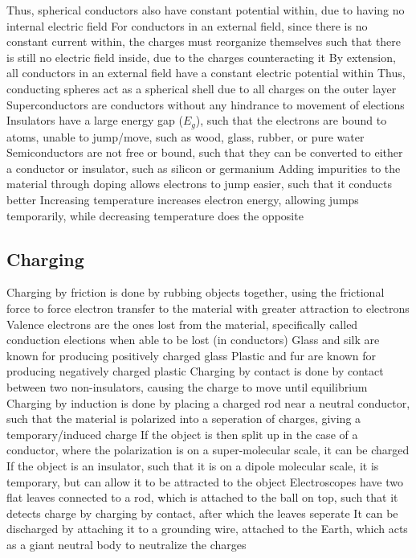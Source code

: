 \documentclass[11 pt, twoside]{article}
\newenvironment{outline*}
{
	\begin{outline}[enumerate]
	}
	{\end{outline}
}
\begin{document}
\begin{outline*}
\4 Thus, spherical conductors also have constant potential within, due to having no internal electric field
\3 For conductors in an external field, since there is no constant current within, the charges must reorganize themselves such that there is still no electric field inside, due to the charges counteracting it
\4 By extension, all conductors in an external field have a constant electric potential within
\3 Thus, conducting spheres act as a spherical shell due to all charges on the outer layer
\3 Superconductors are conductors without any hindrance to movement of elections
\2 Insulators have a large energy gap ($E_g$), such that the electrons are bound to atoms, unable to jump/move, such as wood, glass, rubber, or pure water
\2 Semiconductors are not free or bound, such that they can be converted to either a conductor or insulator, such as silicon or germanium
\3 Adding impurities to the material through doping allows electrons to jump easier, such that it conducts better
\3 Increasing temperature increases electron energy, allowing jumps temporarily, while decreasing temperature does the opposite
\end{outline*}

\subsection{Charging}
\begin{outline*}
\1 Charging by friction is done by rubbing objects together, using the frictional force to force electron transfer to the material with greater attraction to electrons
\2 Valence electrons are the ones lost from the material, specifically called conduction elections when able to be lost (in conductors)
\2 Glass and silk are known for producing positively charged glass
\2 Plastic and fur are known for producing negatively charged plastic
\1 Charging by contact is done by contact between two non-insulators, causing the charge to move until equilibrium
\1 Charging by induction is done by placing a charged rod near a neutral conductor, such that the material is polarized into a seperation of charges, giving a temporary/induced charge
\2 If the object is then split up in the case of a conductor, where the polarization is on a super-molecular scale, it can be charged
\2 If the object is an insulator, such that it is on a dipole molecular scale, it is temporary, but can allow it to be attracted to the object
\1 Electroscopes have two flat leaves connected to a rod, which is attached to the ball on top, such that it detects charge by charging by contact, after which the leaves seperate
\2 It can be discharged by attaching it to a grounding wire, attached to the Earth, which acts as a giant neutral body to neutralize the charges
\end{outline*}
\end{document}
